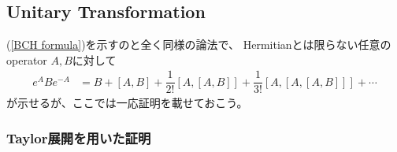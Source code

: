 \newpage
\subsection{Unitary Transformation}

(\ref{BCH formula})を示すのと全く同様の論法で、
Hermitianとは限らない任意のoperator $A, B$に対して
\begin{align}
    e^A B e^{-A}
    &=
    B + [A,B] + \dfrac{1}{2!}[A,[A,B]]
    +
    \dfrac{1}{3!}[A,[A,[A,B]]]
    +
    \cdots
\label{unitary transf formula for operator}
\end{align}
が示せるが、ここでは一応証明を載せておこう。

\subsubsection{Taylor展開を用いた証明}
\label{proof for unitary transf formula for operator}

